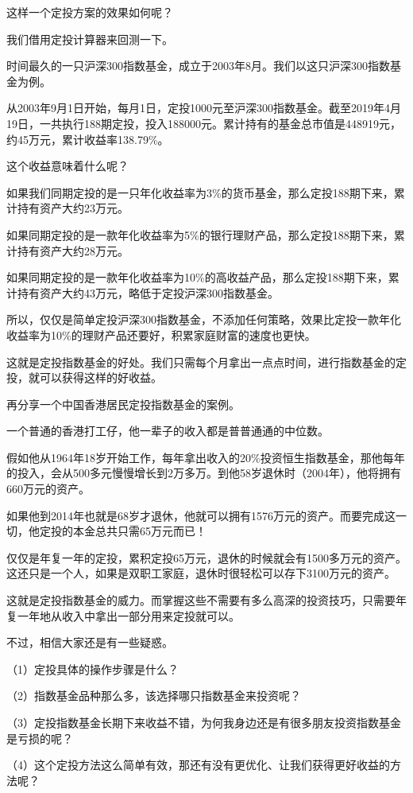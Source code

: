 这样一个定投方案的效果如何呢？

我们借用定投计算器来回测一下。

时间最久的一只沪深300指数基金，成立于2003年8月。我们以这只沪深300指数基金为例。

{\kaishu 从2003年9月1日开始，每月1日，定投1000元至沪深300指数基金。截至2019年4月19日，一共执行188期定投，投入188000元。累计持有的基金总市值是448919元，约45万元，累计收益率138.79\%。}

这个收益意味着什么呢？

如果我们同期定投的是一只年化收益率为3\%的货币基金，那么定投188期下来，累计持有资产大约23万元。

如果同期定投的是一款年化收益率为5\%的银行理财产品，那么定投188期下来，累计持有资产大约28万元。

如果同期定投的是一款年化收益率为10\%的高收益产品，那么定投188期下来，累计持有资产大约43万元，略低于定投沪深300指数基金。

所以，仅仅是简单定投沪深300指数基金，不添加任何策略，效果比定投一款年化收益率为10\%的理财产品还要好，积累家庭财富的速度也更快。

这就是定投指数基金的好处。我们只需每个月拿出一点点时间，进行指数基金的定投，就可以获得这样的好收益。

再分享一个中国香港居民定投指数基金的案例。

{\kaishu 一个普通的香港打工仔，他一辈子的收入都是普普通通的中位数。}

{\kaishu 假如他从1964年18岁开始工作，每年拿出收入的20\%投资恒生指数基金，那他每年的投入，会从500多元慢慢增长到2万多万。到他58岁退休时（2004年），他将拥有660万元的资产。}

{\kaishu 如果他到2014年也就是68岁才退休，他就可以拥有1576万元的资产。而要完成这一切，他定投的本金总共只需65万元而已！}

{\kaishu 仅仅是年复一年的定投，累积定投65万元，退休的时候就会有1500多万元的资产。这还只是一个人，如果是双职工家庭，退休时很轻松可以存下3100万元的资产。}

{\kaishu 这就是定投指数基金的威力。而掌握这些不需要有多么高深的投资技巧，只需要年复一年地从收入中拿出一部分用来定投就可以。}

不过，相信大家还是有一些疑惑。

（1）定投具体的操作步骤是什么？

（2）指数基金品种那么多，该选择哪只指数基金来投资呢？

（3）定投指数基金长期下来收益不错，为何我身边还是有很多朋友投资指数基金是亏损的呢？

（4）这个定投方法这么简单有效，那还有没有更优化、让我们获得更好收益的方法呢？

